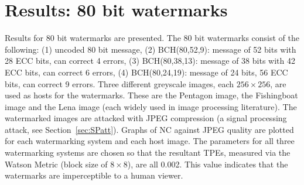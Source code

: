 \documentclass[10pt,twocolumn]{article}
\begin{document}
\section{Results: 80 bit watermarks}
Results for 80 bit watermarks are presented. The 80 bit watermarks consist of the following:
(1) uncoded 80 bit message, (2) BCH(80,52,9): message of 52 bits with 28 ECC bits, can correct 4 errors,
(3) BCH(80,38,13): message of 38 bits with 42 ECC bits, can correct 6 errors, (4) BCH(80,24,19): message
of 24 bits, 56 ECC bits, can correct 9 errors. 
Three different greyscale images, each $256\times256$, are used as hosts for the watermarks.
These are the Pentagon image, the Fishingboat image and the Lena image (each widely used in image processing
literature). The watermarked images are attacked with JPEG compression (a signal processing attack, see Section~\ref{sec:SPatt}).
Graphs of NC against JPEG quality are plotted for each watermarking system and each host image.
The parameters for all three watermarking systems are chosen so that the resultant TPEs, measured via
the Watson Metric (block size of $8\times8$), are all 0.002. This value indicates that the watermarks
are imperceptible to a human viewer. 
\end{document}
